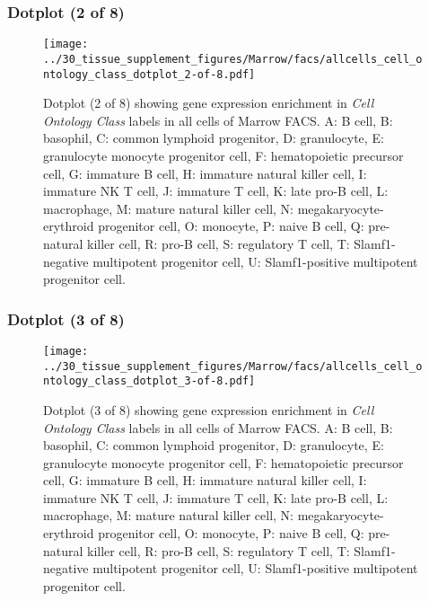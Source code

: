 \subsubsection{Dotplot (2 of 8)}
\begin{figure}[h]
\centering
\texttt{[image: ../30\_tissue\_supplement\_figures/Marrow/facs/allcells\_cell\_ontology\_class\_dotplot\_2-of-8.pdf]}

\caption{ Dotplot (2 of 8)  showing gene expression enrichment in \emph{Cell Ontology Class} labels in all cells of Marrow FACS. A: B cell, B: basophil, C: common lymphoid progenitor, D: granulocyte, E: granulocyte monocyte progenitor cell, F: hematopoietic precursor cell, G: immature B cell, H: immature natural killer cell, I: immature NK T cell, J: immature T cell, K: late pro-B cell, L: macrophage, M: mature natural killer cell, N: megakaryocyte-erythroid progenitor cell, O: monocyte, P: naive B cell, Q: pre-natural killer cell, R: pro-B cell, S: regulatory T cell, T: Slamf1-negative multipotent progenitor cell, U: Slamf1-positive multipotent progenitor cell.}
\end{figure}


\clearpage

\subsubsection{Dotplot (3 of 8)}
\begin{figure}[h]
\centering
\texttt{[image: ../30\_tissue\_supplement\_figures/Marrow/facs/allcells\_cell\_ontology\_class\_dotplot\_3-of-8.pdf]}

\caption{ Dotplot (3 of 8)  showing gene expression enrichment in \emph{Cell Ontology Class} labels in all cells of Marrow FACS. A: B cell, B: basophil, C: common lymphoid progenitor, D: granulocyte, E: granulocyte monocyte progenitor cell, F: hematopoietic precursor cell, G: immature B cell, H: immature natural killer cell, I: immature NK T cell, J: immature T cell, K: late pro-B cell, L: macrophage, M: mature natural killer cell, N: megakaryocyte-erythroid progenitor cell, O: monocyte, P: naive B cell, Q: pre-natural killer cell, R: pro-B cell, S: regulatory T cell, T: Slamf1-negative multipotent progenitor cell, U: Slamf1-positive multipotent progenitor cell.}
\end{figure}


\clearpage

